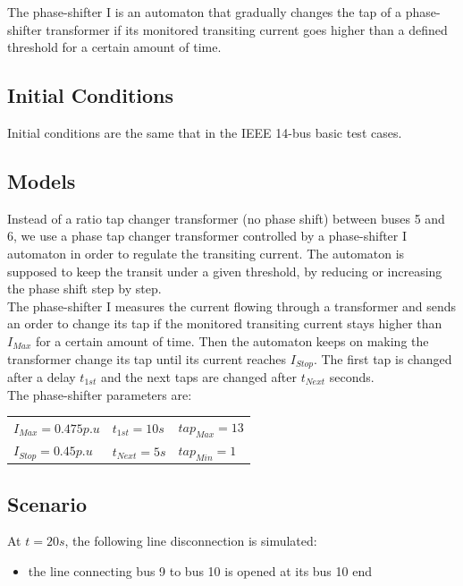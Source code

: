 \documentclass[a4paper, 12pt]{report}
\begin{document}
The phase-shifter I is an automaton that gradually changes the tap of a phase-shifter transformer if its monitored transiting current goes higher than a defined threshold for a certain amount of time.

\subsection{Initial Conditions}

Initial conditions are the same that in the IEEE 14-bus basic test cases.

\subsection{Models}

Instead of a ratio tap changer transformer (no phase shift) between buses 5 and 6, we use a phase tap changer transformer controlled by a phase-shifter I automaton in order to regulate the transiting current.
The automaton is supposed to keep the transit under a given threshold, by reducing or increasing the phase shift step by step. \\

The phase-shifter I measures the current flowing through a transformer and sends an order to change its tap if the monitored transiting current stays higher than $I_{Max}$ for a certain amount of time. Then the automaton keeps on making the transformer change its tap until its current reaches $I_{Stop}$. The first tap is changed after a delay $t_{1st}$ and the next taps are changed after $t_{Next}$ seconds. \\

The phase-shifter parameters are:
\begin{center}
\begin{tabular}{l|l|l}
   $I_{Max}=0.475p.u$ & $t_{1st}=10s$ & $tap_{Max}=13$ \\
   $I_{Stop}=0.45p.u$  & $t_{Next}=5s$ & $tap_{Min}=1$ \\
\end{tabular}
\end{center}

\subsection{Scenario}
At $t=20s$, the following line disconnection is simulated:
\begin{itemize}
\item{the line connecting bus 9 to bus 10 is opened at its bus 10 end}
\end{itemize}
\end{document}
